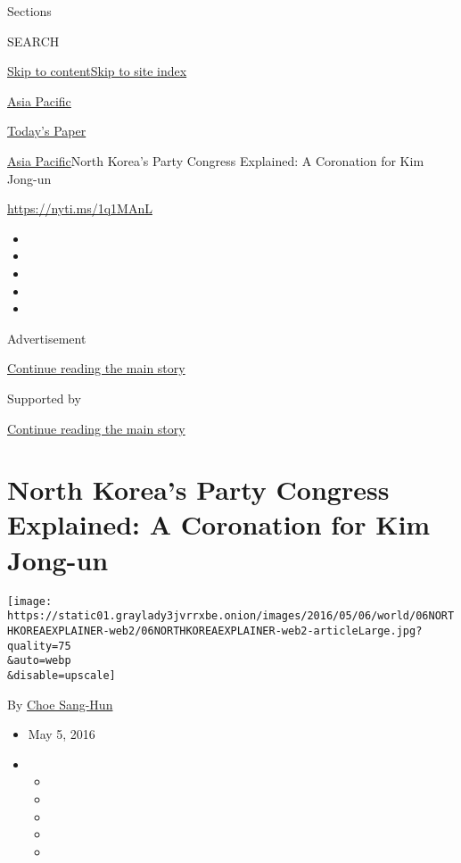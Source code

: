 Sections

SEARCH

\protect\hyperlink{site-content}{Skip to
content}\protect\hyperlink{site-index}{Skip to site index}

\href{https://www.nytimes3xbfgragh.onion/section/world/asia}{Asia
Pacific}

\href{https://myaccount.nytimes3xbfgragh.onion/auth/login?response_type=cookie\&client_id=vi}{}

\href{https://www.nytimes3xbfgragh.onion/section/todayspaper}{Today's
Paper}

\href{/section/world/asia}{Asia Pacific}\textbar{}North Korea's Party
Congress Explained: A Coronation for Kim Jong-un

\url{https://nyti.ms/1q1MAnL}

\begin{itemize}
\item
\item
\item
\item
\item
\end{itemize}

Advertisement

\protect\hyperlink{after-top}{Continue reading the main story}

Supported by

\protect\hyperlink{after-sponsor}{Continue reading the main story}

\hypertarget{north-koreas-party-congress-explained-a-coronation-for-kim-jong-un}{%
\section{North Korea's Party Congress Explained: A Coronation for Kim
Jong-un}\label{north-koreas-party-congress-explained-a-coronation-for-kim-jong-un}}

\texttt{[image: https://static01.graylady3jvrrxbe.onion/images/2016/05/06/world/06NORTHKOREAEXPLAINER-web2/06NORTHKOREAEXPLAINER-web2-articleLarge.jpg?quality=75\\\&auto=webp\\\&disable=upscale]}

By \href{http://www.nytimes3xbfgragh.onion/by/choe-sang-hun}{Choe
Sang-Hun}

\begin{itemize}
\item
  May 5, 2016
\item
  \begin{itemize}
  \item
  \item
  \item
  \item
  \item
  \end{itemize}
\end{itemize}

